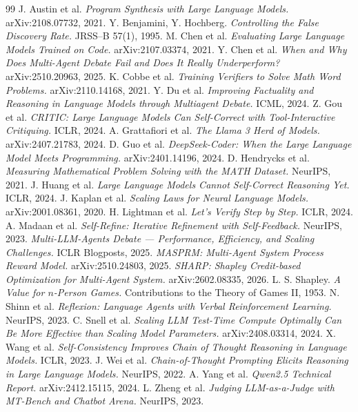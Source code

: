 \documentclass[11pt,a4paper]{article}
\begin{document}
\begin{thebibliography}{99}\small
{} J. Austin et al. \emph{Program Synthesis with Large Language Models.}
arXiv:2108.07732, 2021.
 Y. Benjamini, Y. Hochberg. \emph{Controlling the False Discovery Rate.}
JRSS--B 57(1), 1995.
 M. Chen et al. \emph{Evaluating Large Language Models Trained on Code.}
arXiv:2107.03374, 2021.
 Y. Chen et al. \emph{When and Why Does Multi-Agent Debate Fail and Does It
Really Underperform?} arXiv:2510.20963, 2025.
 K. Cobbe et al. \emph{Training Verifiers to Solve Math Word Problems.}
arXiv:2110.14168, 2021.
 Y. Du et al. \emph{Improving Factuality and Reasoning in Language Models
through Multiagent Debate.} ICML, 2024.
 Z. Gou et al. \emph{CRITIC: Large Language Models Can Self-Correct with
Tool-Interactive Critiquing.} ICLR, 2024.
 A. Grattafiori et al. \emph{The Llama 3 Herd of Models.}
arXiv:2407.21783, 2024.
 D. Guo et al. \emph{DeepSeek-Coder: When the Large Language Model Meets
Programming.} arXiv:2401.14196, 2024.
 D. Hendrycks et al. \emph{Measuring Mathematical Problem Solving with
the MATH Dataset.} NeurIPS, 2021.
 J. Huang et al. \emph{Large Language Models Cannot Self-Correct Reasoning
Yet.} ICLR, 2024.
 J. Kaplan et al. \emph{Scaling Laws for Neural Language Models.}
arXiv:2001.08361, 2020.
 H. Lightman et al. \emph{Let's Verify Step by Step.} ICLR, 2024.
 A. Madaan et al. \emph{Self-Refine: Iterative Refinement with
Self-Feedback.} NeurIPS, 2023.
 \emph{Multi-LLM-Agents Debate --- Performance, Efficiency, and Scaling
Challenges.} ICLR Blogposts, 2025.
 \emph{MASPRM: Multi-Agent System Process Reward Model.} arXiv:2510.24803,
2025.
 \emph{SHARP: Shapley Credit-based Optimization for Multi-Agent System.}
arXiv:2602.08335, 2026.
 L. S. Shapley. \emph{A Value for $n$-Person Games.} Contributions to the
Theory of Games II, 1953.
 N. Shinn et al. \emph{Reflexion: Language Agents with Verbal Reinforcement
Learning.} NeurIPS, 2023.
 C. Snell et al. \emph{Scaling LLM Test-Time Compute Optimally Can Be More
Effective than Scaling Model Parameters.} arXiv:2408.03314, 2024.
 X. Wang et al. \emph{Self-Consistency Improves Chain of Thought Reasoning in
Language Models.} ICLR, 2023.
 J. Wei et al. \emph{Chain-of-Thought Prompting Elicits Reasoning in Large
Language Models.} NeurIPS, 2022.
 A. Yang et al. \emph{Qwen2.5 Technical Report.} arXiv:2412.15115, 2024.
 L. Zheng et al. \emph{Judging LLM-as-a-Judge with MT-Bench and Chatbot
Arena.} NeurIPS, 2023.
\end{thebibliography}
\end{document}
